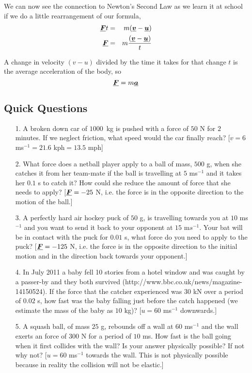 \noindent We can now see the connection to Newton's Second Law as we learn it at school if we do a little rearrangement of our formula,
\begin{eqnarray}
{\mathit{\underline{\boldsymbol{F}}}}t&=&m({\mathit{\underline{\boldsymbol{v}}}}-{\mathit{\underline{\boldsymbol{u}}}})\nonumber \\
{\mathit{\underline{\boldsymbol{F}}}}&=&m\frac{({\mathit{\underline{\boldsymbol{v}}}}-{\mathit{\underline{\boldsymbol{u}}}})}{t}
\end{eqnarray}

\noindent A change in velocity $(v-u)$ divided by the time it takes for that change $t$ is the average acceleration of the body, so
\begin{equation}
{\mathit{\underline{\boldsymbol{F}}}}=m{\mathit{\underline{\boldsymbol{a}}}}
\end{equation}


\subsection*{Quick Questions}
\begin{itemize}
\item[1.] A broken down car of $1000$\ kg is pushed with a force of $50$ N for $2$ minutes.  If we neglect friction, what speed would the car finally reach? \color{red}[$v=6$ ms$^{-1}=21.6$ kph$=13.5$ mph]\color{black}
\item[2.] What force does a netball player apply to a ball of mass, $500$ g, when she catches it from her team-mate if the ball is travelling at $5$ ms$^{-1}$ and it takes her $0.1$ s to catch it?  How could she reduce the amount of force that she needs to apply? \color{red}[${\mathit{\underline{\boldsymbol{F}}}}=-25$ N, i.e. the force is in the opposite direction to the motion of the ball.]\color{black}
\item[3.] A perfectly hard air hockey puck of $50$ g, is travelling towards you at $10$ ms$^{-1}$ and you want to send it back to your opponent at $15$ m$s^{-1}$.  Your bat will be in contact with the puck for $0.01$ s, what force do you need to apply to the puck? \color{red}[${\mathit{\underline{\boldsymbol{F}}}}=-125$ N, i.e. the force is in the opposite direction to the initial motion and in the direction back towards your opponent.] \color{black}
\item[4.] In July 2011 a baby fell 10 stories from a hotel window and was caught by a passer-by and they both survived (http://www.bbc.co.uk/news/magazine-14150524).  If the force that the catcher experienced was $30$ kN over a period of $0.02$ s, how fast was the baby falling just before the catch happened (we estimate the mass of the baby as $10$ kg)? \color{red}[$u=60$ ms$^{-1}$ downwards.]\color{black}
\item[5.] A squash ball, of mass $25$ g, rebounds off a wall at $60$ ms$^{-1}$ and the wall exerts an force of $300$ N for a period of $10$ ms.  How fast is the ball going when it first collides with the wall?  Is your answer physically possible? If not why not? \color{red}[$u=60$  ms$^{-1}$ towards the wall.  This is not physically possible because in reality the collision will not be elastic.]\color{black}
\end{itemize}

